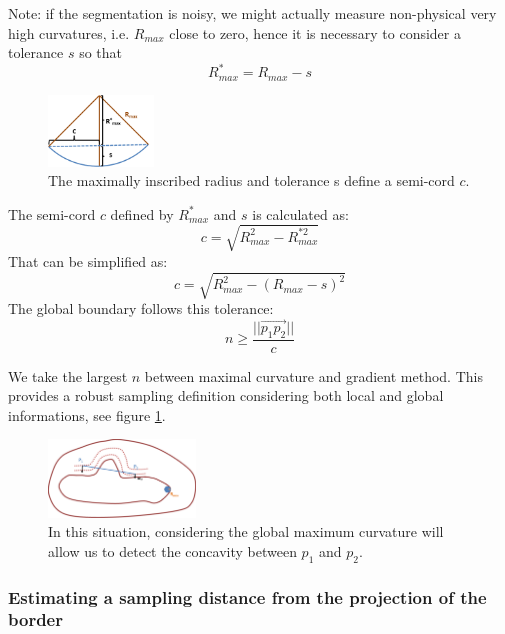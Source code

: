 \documentclass[11pt,a4paper]{article}
\begin{document}
Note: if the segmentation is noisy, we might actually measure non-physical very high curvatures, i.e. $R_{max}$ close to zero, hence it is necessary to consider a tolerance $s$ so that 
\begin{equation}
R_{max}^* = R_{max} - s
\end{equation}

\begin{figure}[h!]
			\centering
			\includegraphics[width=0.25\textwidth]{Drawings/CurvatureTolerance.png}
			\caption{The maximally inscribed radius and tolerance s define a semi-cord $c$.}
\end{figure}

The semi-cord $c$ defined by $R_{max}^*$ and $s$ is calculated as:
\begin{equation}
c = \sqrt{R_{max}^2 - R_{max}^{*2}}
\end{equation} 
That can be simplified as:
\begin{equation}
c = \sqrt{R_{max}^2 - (R_{max} - s)^2}
\end{equation}
The global boundary follows this tolerance:
\begin{equation}
n \geq \frac{||\overset{\rightarrow}{p_1p_2}||}{c}
\end{equation}

We take the largest $n$ between maximal curvature and gradient method. This provides a robust sampling definition considering both local and global informations, see figure \ref{test sampling}.
\begin{figure}[h!]
			\label{test sampling}
			\centering
			\includegraphics[width=0.35\textwidth]{Drawings/CurvatureTestExample2.png}
			\caption{In this situation, considering the global maximum curvature will allow us to detect the concavity between $p_1$ and $p_2$.}
\end{figure}

\subsubsection{Estimating a sampling distance from the projection of the border}
\end{document}
